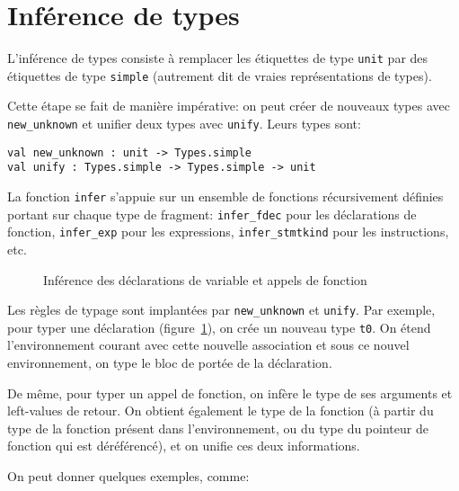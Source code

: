 \section{Inférence de types}

L'inférence de types consiste à remplacer les étiquettes de type \texttt{unit}
par des étiquettes de type \texttt{simple} (autrement dit de vraies
représentations de types).

Cette étape se fait de manière impérative: on peut créer de nouveaux types avec
\texttt{new\_unknown} et unifier deux types
avec \texttt{unify}. Leurs types sont:

\begin{verbatim}
val new_unknown : unit -> Types.simple
val unify : Types.simple -> Types.simple -> unit
\end{verbatim}

La fonction \texttt{infer} s'appuie sur un ensemble de fonctions récursivement
définies portant sur chaque type de fragment: \texttt{infer\_fdec} pour les
déclarations de fonction, \texttt{infer\_exp} pour les expressions,
\texttt{infer\_stmtkind} pour les instructions, etc.

\begin{figure}



\caption{Inférence des déclarations de variable et appels de
         fonction}

\label{fig:implem-unif-stmt}
\end{figure}

Les règles de typage sont implantées par \texttt{new\_unknown} et
\texttt{unify}. Par exemple, pour typer une déclaration
(figure~\ref{fig:implem-unif-stmt}), on crée un nouveau
type \texttt{t0}. On étend l'environnement courant avec cette nouvelle
association et sous ce nouvel environnement, on type le bloc de portée de la
déclaration.

De même, pour typer un appel de fonction, on infère le type de ses arguments et
left-values de retour. On obtient également le type de la fonction (à partir du
type de la fonction présent dans l'environnement, ou du type du pointeur de
fonction qui est déréférencé), et on unifie ces deux informations.

On peut donner quelques exemples, comme:

